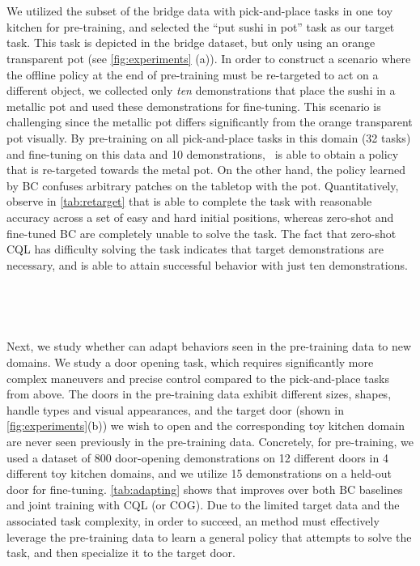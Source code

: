 ~


~

\noindent We utilized the subset of the bridge data with pick-and-place tasks in one toy kitchen for pre-training, and selected the ``put sushi in pot'' task as our target task. This task is depicted in the bridge dataset, but only using an orange transparent pot (see \autoref{fig:experiments} (a)). In order to construct a scenario where the offline policy at the end of pre-training must be re-targeted to act on a different object, we collected only \emph{ten} demonstrations that place the sushi in a metallic pot and used these demonstrations for fine-tuning.
This scenario is challenging since the metallic pot differs significantly from the orange transparent pot visually. 
By pre-training on all pick-and-place tasks in this domain (32 tasks) and fine-tuning on this data and 10 demonstrations, \ptrmethodname\ is able to obtain a policy that is re-targeted towards the metal pot. On the other hand, the policy learned by BC confuses arbitrary patches on the tabletop with the pot. Quantitatively, observe in \autoref{tab:retarget} that \ptrmethodname is able to complete the task with reasonable accuracy across a set of easy and hard initial positions, whereas zero-shot and fine-tuned BC are completely unable to solve the task. The fact that zero-shot CQL has difficulty solving the task indicates that target demonstrations are necessary, and \ptrmethodname is able to attain successful behavior with just ten demonstrations.

~


~

\noindent Next, we study whether \ptrmethodname can adapt behaviors seen in the pre-training data to new domains. We study a door opening task, which requires significantly more complex maneuvers and precise control compared to the pick-and-place tasks from above. 
The doors in the pre-training data exhibit different sizes, shapes, handle types and visual appearances, and the target door (shown in \autoref{fig:experiments}(b)) we wish to open and the corresponding toy kitchen domain are never seen previously in the pre-training data. Concretely, for pre-training, we used a dataset of 800 door-opening demonstrations on 12 different doors in 4 different toy kitchen domains, and we utilize 15 demonstrations on a held-out door for fine-tuning. \autoref{tab:adapting} shows that \ptrmethodname improves over both BC baselines and joint training with CQL (or COG). Due to the limited target data and the associated task complexity, in order to succeed, an method must effectively leverage the pre-training data to learn a general policy that attempts to solve the task, and then specialize it to the target door.

